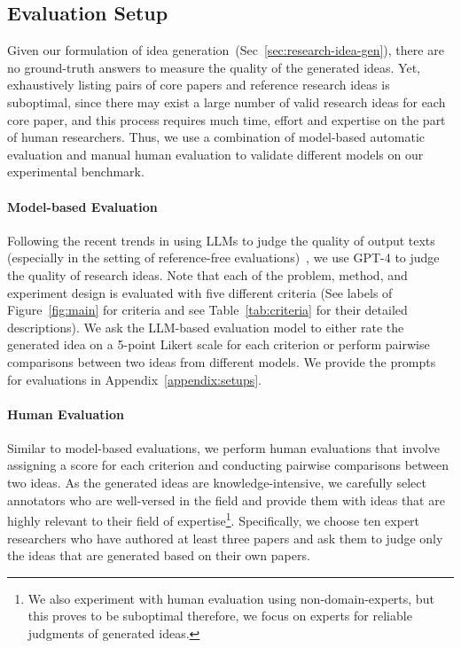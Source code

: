 \subsection{Evaluation Setup}
Given our formulation of idea generation~(Sec~\ref{sec:research-idea-gen}), there are no ground-truth answers to measure the quality of the generated ideas. Yet, exhaustively listing pairs of core papers and reference research ideas is suboptimal, since there may exist a large number of valid research ideas for each core paper, and this process requires much time, effort and expertise on the part of human researchers. Thus, we use a combination of model-based automatic evaluation and manual human evaluation to validate different models on our experimental benchmark.




\paragraph{Model-based Evaluation}
Following the recent trends in using LLMs to judge the quality of output texts (especially in the setting of reference-free evaluations)~\cite{LLM/Judge/1, LLM/Judge/2, G-Eval}, we use GPT-4 to judge the quality of research ideas. Note that each of the problem, method, and experiment design is evaluated with five different criteria (See labels of Figure~\ref{fig:main} for criteria and see Table~\ref{tab:criteria} for their detailed descriptions). We ask the LLM-based evaluation model to either rate the generated idea on a 5-point Likert scale for each criterion or perform pairwise comparisons between two ideas from different models. We provide the prompts for evaluations in Appendix~\ref{appendix:setups}.  

\paragraph{Human Evaluation}
Similar to model-based evaluations, we perform human evaluations that involve assigning a score for each criterion and conducting pairwise comparisons between two ideas. As the generated ideas are knowledge-intensive, we carefully select annotators who are well-versed in the field and provide them with ideas that are highly relevant to their field of expertise\footnote{We also experiment with human evaluation using non-domain-experts, but this proves to be suboptimal therefore, we focus on experts for reliable judgments of generated ideas.}. Specifically, we choose ten expert researchers who have authored at least three papers and ask them to judge only the ideas that are generated based on their own papers.

